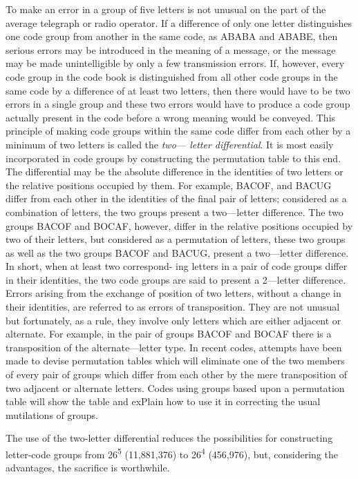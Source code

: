 \mypara To make an error in a group of ﬁve letters is not unusual on the
part of the average telegraph or radio operator. If a difference of only
one letter distinguishes one code group from another in the same code,
as ABABA and ABABE, then serious errors may be introduced in the
meaning of a message, or the message may be made unintelligible by only
a few transmission errors. If, however, every code group in the code
book is distinguished from all other code groups in the same code by a
difference of at least two letters, then there would have to be two errors
in a single group and these two errors would have to produce a code
group actually present in the code before a wrong meaning would be
conveyed. This principle of making code groups within the same code
differ from each other by a minimum of two letters is called the \textit{two—
letter differential}. It is most easily incorporated in code groups by constructing the permutation table to this end. The differential may be the
absolute difference in the identities of two letters or the relative positions
occupied by them. For example, BACOF, and BACUG differ from each
other in the identities of the ﬁnal pair of letters; considered as a combination of letters, the two groups present a two—letter difference. The two
groups BACOF and BOCAF, however, differ in the relative positions
occupied by two of their letters, but considered as a permutation of
letters, these two groups as well as the two groups BACOF and BACUG,
present a two—letter difference. In short, when at least two correspond-
ing letters in a pair of code groups differ in their identities, the two code
groups are said to present a 2—letter difference. Errors arising from the
exchange of position of two letters, without a change in their identities,
are referred to as errors of transposition. They are not unusual but
fortunately, as a rule, they involve only letters which are either adjacent
or alternate. For example, in the pair of groups BACOF and BOCAF
there is a transposition of the alternate—letter type. In recent codes,
attempts have been made to devise permutation tables which will eliminate
one of the two members of every pair of groups which differ from each
other by the mere transposition of two adjacent or alternate letters. Codes
using groups based upon a permutation table will show the table and
exPlain how to use it in correcting the usual mutilations of groups.

\mypara The use of the two-letter differential reduces the possibilities for
constructing letter-code groups from 26\textsuperscript{5} (11,881,376) to 26\textsuperscript{4} (456,976),
but, considering the advantages, the sacriﬁce is worthwhile.

